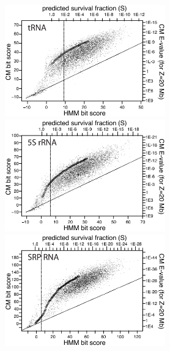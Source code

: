 \documentclass{bioinfo}
\begin{document}
\begin{figure}[!tpb]
\centerline{\includegraphics[height=1.9in]{figs/tRNA_fst}}
\centerline{\includegraphics[height=1.9in]{figs/5S_fst}}
\centerline{\includegraphics[height=1.9in]{figs/SRP_fst}}

\label{Fig:fst}
\end{figure}
\end{document}
